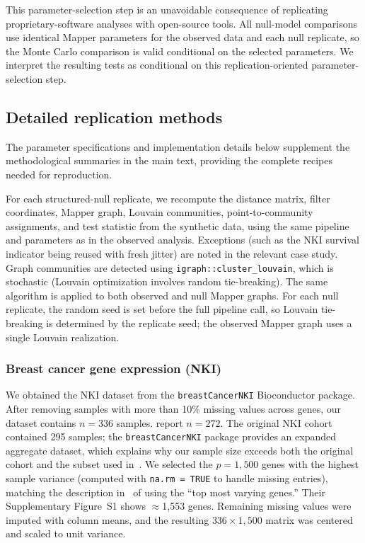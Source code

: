 \documentclass[hidelinks]{siamart251216}
\begin{document}
This parameter-selection step is an unavoidable consequence of
replicating proprietary-software analyses with open-source tools.  All null-model comparisons use identical Mapper parameters for the
observed data and each null replicate, so the Monte Carlo comparison
is valid conditional on the selected parameters.  We interpret the
resulting tests as conditional on this replication-oriented
parameter-selection step.


\subsection{Detailed replication methods}\label{sm:replication-details}

The parameter specifications and implementation details below
supplement the methodological summaries in the main text, providing
the complete recipes needed for reproduction.

For each structured-null replicate, we recompute the distance matrix,
filter coordinates, Mapper graph, Louvain communities, point-to-community
assignments, and test statistic from the synthetic data, using the same
pipeline and parameters as in the observed analysis.  Exceptions (such as
the NKI survival indicator being reused with fresh jitter) are noted
in the relevant case study.  Graph communities are detected using
\texttt{igraph::cluster\_louvain}, which is stochastic (Louvain
optimization involves random tie-breaking).  The same algorithm is
applied to both observed and null Mapper graphs.  For each null
replicate, the random seed is set before the full pipeline call, so
Louvain tie-breaking is determined by the replicate seed; the observed
Mapper graph uses a single Louvain realization.

\subsubsection*{Breast cancer gene expression (NKI)}

We obtained the NKI dataset from the \texttt{breastCancerNKI}
Bioconductor package.  After removing samples with more than 10\%
missing values across genes, our dataset contains $n = 336$ samples.
\cite{Lum2013} report $n = 272$.  The original NKI cohort
\citep{vanDeVijver2002} contained 295 samples; the
\texttt{breastCancerNKI} package provides an expanded aggregate dataset,
which explains why our sample size exceeds both the original cohort and
the subset used in~\cite{Lum2013}.  We selected the
$p = 1{,}500$ genes with the highest sample variance (computed with
\texttt{na.rm = TRUE} to handle missing entries), matching the description
in~\cite{Lum2013} of using the ``top most varying genes.''
Their Supplementary Figure~S1 shows $\approx$1,553 genes.  Remaining missing
values were imputed with column means, and the resulting
$336 \times 1{,}500$ matrix was centered and scaled to unit variance.
\end{document}
